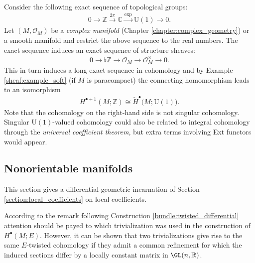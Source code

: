     \begin{property}
        Consider the following exact sequence of topological groups:
        \begin{gather}
            0\longrightarrow\mathbb{Z}\overset{2\pi}{\longrightarrow}\mathbb{C}\overset{\exp}{\longrightarrow}\mathrm{U}(1)\longrightarrow0.
        \end{gather}
        Let $(M,\mathcal{O}_M)$ be a \textit{complex manifold} (Chapter \ref{chapter:complex_geometry}) or a smooth manifold and restrict the above sequence to the real numbers. The exact sequence induces an exact sequence of structure sheaves:
        \begin{gather}
            0\longrightarrow\flat\mathbb{Z}\longrightarrow\mathcal{O}_M\longrightarrow\mathcal{O}_M^\times\longrightarrow0.
        \end{gather}
        This in turn induces a long exact sequence in cohomology and by Example \ref{sheaf:example_soft} (if $M$ is paracompact) the connecting homomorphism leads to an isomorphism
        \begin{gather}
            \label{bundle:U1_cohomology_isomorphism}
            H^{\bullet+1}(M;\mathbb{Z})\cong\check{H}^\bullet\big(M;\mathrm{U}(1)\big).
        \end{gather}
        Note that the cohomology on the right-hand side is not singular cohomology. Singular $\mathrm{U}(1)$-valued cohomology could also be related to integral cohomology through the \textit{universal coefficient theorem}, but extra terms involving Ext functors would appear.
    \end{property}

\subsection{Nonorientable manifolds}

    This section gives a differential-geometric incarnation of Section \ref{section:local_coefficients} on local coefficients.

    \begin{remark}
        According to the remark following Construction \ref{bundle:twisted_differential} attention should be payed to which trivialization was used in the construction of $H^\bullet(M;E)$. However, it can be shown that two trivializations give rise to the same $E$-twisted cohomology if they admit a common refinement for which the induced sections differ by a locally constant matrix in $\GL(n,\mathbb{R})$.
    \end{remark}

